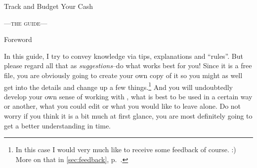 \begin{center}\Large\sffamily
Track and Budget Your Cash
\end{center}
\begin{center}\scshape\large
	---the guide---
\end{center}

\vspace{1cm}
\begin{center}\sffamily
	Foreword \rmfamily\\
	\begin{minipage}[t]{0.8\columnwidth}\small
		In this guide, I try to convey knowledge via tips, explanations and ``rules''.
		But please regard all that as \emph{suggestions}--do what works best for you!
		Since it is a free file, you are obviously going to create your own copy of it so you might as well get into the details and change up a few things.\footnote{In this case I would very much like to receive some feedback of course. :) More on that in \autoref{sec:feedback}, p.~\pageref{sec:feedback}.}
		And you will undoubtedly develop your own sense of working with \tfn, what is best to be used in a certain way or another, what you could edit or what you would like to leave alone.
		Do not worry if you think it is a bit much at first glance, you are most definitely going to get a better understanding in time.
	\end{minipage}
\end{center}
\vspace{1cm}

\tableofcontents

